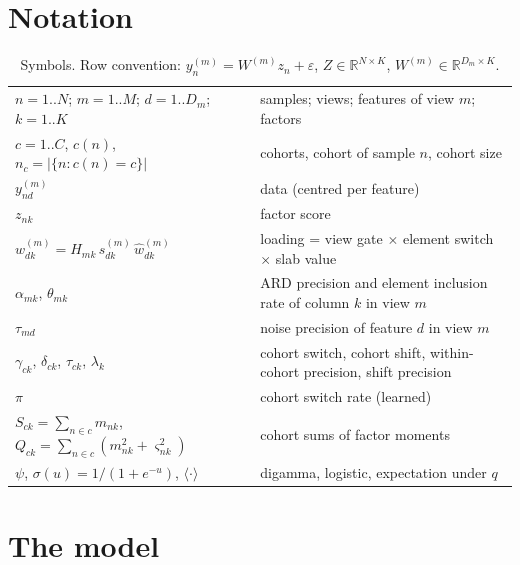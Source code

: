\documentclass[11pt,a4paper]{article}
\newcommand{\wh}{\hat w}
\theoremstyle{definition}
\theoremstyle{remark}
\begin{document}
\section{Notation}
\begin{table}[h]\centering\footnotesize
\caption{Symbols. Row convention: $y_n^{(m)}=W^{(m)}z_n+\varepsilon$, $Z\in\mathbb R^{N\times K}$, $W^{(m)}\in\mathbb R^{D_m\times K}$.}
\label{tab:notation}
\begin{tabular}{@{}ll@{}}\toprule
$n=1..N$; $m=1..M$; $d=1..D_m$; $k=1..K$ & samples; views; features of view $m$; factors\\
$c=1..C$, $c(n)$, $n_c=|\{n:c(n)=c\}|$ & cohorts, cohort of sample $n$, cohort size\\
$y^{(m)}_{nd}$ & data (centred per feature)\\
$z_{nk}$ & factor score\\
$w^{(m)}_{dk}=H_{mk}\,s^{(m)}_{dk}\,\wh^{(m)}_{dk}$ & loading = view gate $\times$ element switch $\times$ slab value\\
$\alpha_{mk}$, $\theta_{mk}$ & ARD precision and element inclusion rate of column $k$ in view $m$\\
$\tau_{md}$ & noise precision of feature $d$ in view $m$\\
$\gamma_{ck}$, $\delta_{ck}$, $\tau_{ck}$, $\lambda_k$ & cohort switch, cohort shift, within-cohort precision, shift precision\\
$\pi$ & cohort switch rate (learned)\\
$S_{ck}=\sum_{n\in c}m_{nk}$, $Q_{ck}=\sum_{n\in c}(m^2_{nk}+\varsigma^2_{nk})$ & cohort sums of factor moments\\
$\psi$, $\sigma(u)=1/(1+e^{-u})$, $\langle\cdot\rangle$ & digamma, logistic, expectation under $q$\\
\bottomrule\end{tabular}
\end{table}

\section{The model}
\end{document}

